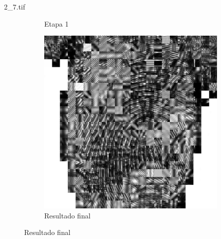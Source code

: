 \documentclass{beamer}
\begin{document}
\begin{frame}{2\_7.tif}
\begin{figure}
\begin{subfigure}[!ht]{0.32\textwidth}
                \caption{Etapa 1}
            \end{subfigure}
            \begin{subfigure}[!ht]{0.32\textwidth}
                \includegraphics[width=\columnwidth]{Fingerprints/2_7_final.jpg}
                \caption{Resultado final}
            \end{subfigure}
        \end{figure}
    \end{frame}
\end{document}
